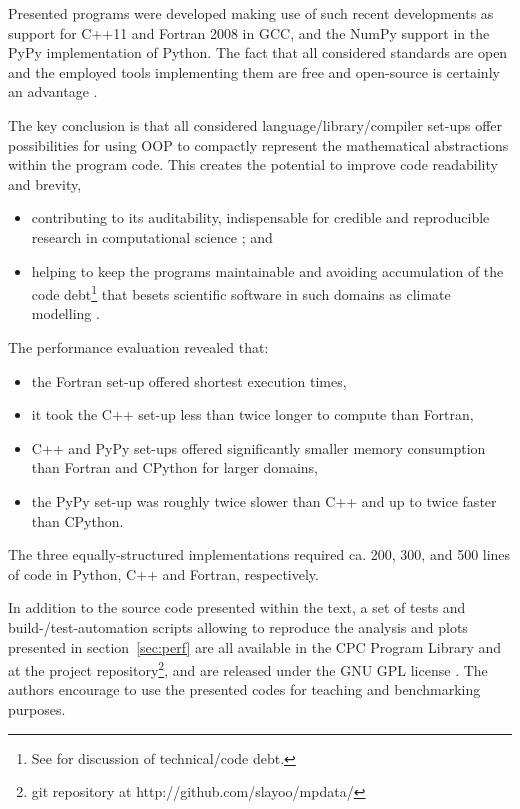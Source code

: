 \documentclass[final,5p,times,twocolumn]{elsarticle}
\newcommand{\url}[1]{{#1}}
\begin{document}
  Presented programs were developed making use of such recent
    developments as support for C++11 and Fortran 2008 in GCC, and
    the NumPy support in the PyPy implementation of Python.
  The fact that all considered standards are open and the employed
    tools implementing them are free and open-source
    is certainly an advantage \citep{Anel_2011}.

  The key conclusion is that all considered language/library/compiler
    set-ups offer possibilities for using OOP to compactly 
    represent the mathematical abstractions within the program code. 
  This creates the potential to improve code readability and brevity,
  \begin{itemize}
    \item{contributing to its 
      auditability, indispensable for credible and reproducible research in computational science 
      \citep{Post_et_al_2005, Merali_et_al_2010, Stodden_et_al_2012}; and
    }
    \item{helping to keep the programs maintainable and avoiding accumulation of the code 
      debt\footnote{See \citet{Buschmann_2011} for discussion of technical/code debt.} 
      that besets scientific software in such domains as climate modelling
      \citep{Freeman_et_al_2010}.
    }
  \end{itemize}
  \noindent 
  The performance evaluation revealed that:
    \begin{itemize}
      \item{the Fortran set-up offered shortest execution times,}
      \item{it took the C++ set-up less than twice longer to compute than Fortran,}
      \item{C++ and PyPy set-ups offered significantly smaller memory consumption 
        than Fortran and CPython for larger domains,}
      \item{the PyPy set-up was roughly twice slower than C++ and up to twice faster than CPython.}
    \end{itemize}
  The three equally-structured implementations required ca. 200, 300, and 500 lines of code 
    in Python, C++ and Fortran, respectively.  

  In addition to the source code presented within the text,
    a set of tests and build-/test-automation scripts
    allowing to reproduce the analysis and plots presented in section~\ref{sec:perf} are all 
    available in the CPC Program Library and at
    the project repository\footnote{git repository at \url{http://github.com/slayoo/mpdata/}},
    and are released under the GNU GPL license \citep{GPLv3}.
  The authors encourage to use the presented codes for teaching and benchmarking purposes.
\end{document}
